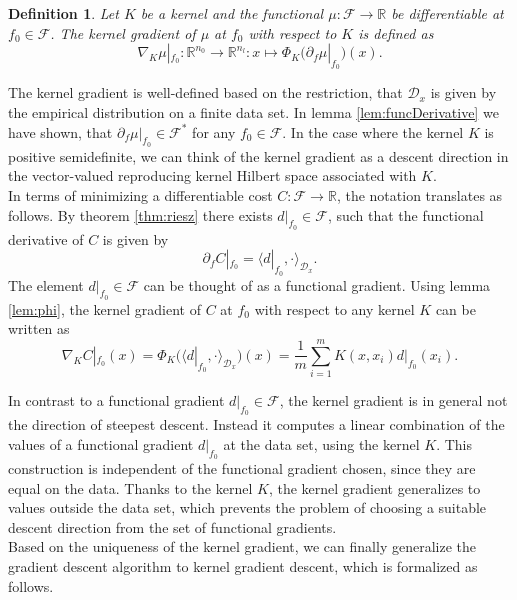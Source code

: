\documentclass[11pt, a4paper]{article}
\newtheorem{definition}[theorem]{Definition}
\newcommand{\R}{\mathbb{R}}
\newcommand{\D}{\mathcal{D}}
\newcommand{\F}{\mathcal{F}}
\begin{document}
\begin{definition}
Let $K$ be a kernel and the functional $\mu : \F \to \R$ be differentiable at $f_0 \in \F$. The kernel gradient of $\mu$ at $f_0$ with respect to $K$ is defined as
\[ \nabla_K\mu|_{f_0}: \R^{n_0} \to \R^{n_l} : x \mapsto \Phi_K \Big ( \partial_f\mu|_{f_0} \Big )(x). \]
\end{definition}

The kernel gradient is well-defined based on the restriction, that $\D_x$ is given by the empirical distribution on a finite data set. In lemma \ref{lem:funcDerivative} we have shown, that  $\partial_f \mu |_{f_0} \in \F^*$ for any $f_0 \in \F$. In the case where the kernel $K$ is positive semidefinite, we can think of the kernel gradient as a descent direction in the vector-valued reproducing kernel Hilbert space associated with $K$. \\

In terms of minimizing a differentiable cost $C: \F \to \R$, the notation translates as follows. By theorem \ref{thm:riesz} there exists $d|_{f_0} \in \F$, such that the functional derivative of $C$ is given by
\[ \partial_{f} C |_{f_0} = \big \langle d|_{f_0}, \cdot \big \rangle_{\D_x}. \]
The element $d|_{f_0} \in \F$ can be thought of as a functional gradient. Using lemma \ref{lem:phi}, the kernel gradient of $C$ at $f_0$ with respect to any kernel $K$ can be written as
\[ \nabla_KC|_{f_0}(x) = \Phi_K \Big ( \big \langle d|_{f_0} , \cdot \big \rangle_{\D_x} \Big )(x) = \frac{1}{m} \sum_{i=1}^{m} K(x,x_i)d|_{f_0}(x_i). \]

In contrast to a functional gradient $d|_{f_0} \in \F$, the kernel gradient is in general not the direction of steepest descent. Instead it computes a linear combination of the values of a functional gradient $d|_{f_0}$ at the data set, using the kernel $K$. This construction is independent of the functional gradient chosen, since they are equal on the data. Thanks to the kernel $K$, the kernel gradient generalizes to values outside the data set, which prevents the problem of choosing a suitable descent direction from the set of functional gradients. \\

Based on the uniqueness of the kernel gradient, we can finally generalize the gradient descent algorithm to kernel gradient descent, which is formalized as follows.
\end{document}
